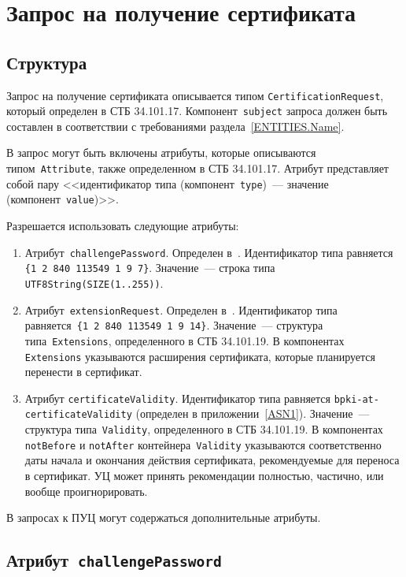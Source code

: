 \section{Запрос на получение сертификата}\label{FMT.CSR}

\subsection{Структура}\label{FMT.CSR.Structure}

Запрос на получение сертификата описывается типом 
\texttt{CertificationRequest}, который определен в СТБ 34.101.17. 
%
Компонент~\texttt{subject} запроса должен быть составлен в соответствии
с требованиями раздела~\ref{ENTITIES.Name}.

В запрос могут быть включены атрибуты, которые описываются 
типом~\texttt{Attribute}, также определенном в СТБ 34.101.17. 
Атрибут представляет собой пару <<идентификатор типа 
(компонент~\texttt{type})~--- значение (компонент~\texttt{value})>>.

Разрешается использовать следующие атрибуты:
\begin{enumerate}
\item
Атрибут~\texttt{challengePassword}. Определен в~\cite{PKCS9}.
%
Идентификатор типа равняется \verb|{1 2 840 113549 1 9 7}|.
Значение~--- строка типа \verb|UTF8String(SIZE(1..255))|.

\item
Атрибут~\texttt{extensionRequest}. Определен в~\cite{PKCS9}.
%
Идентификатор типа равняется~\verb|{1 2 840 113549 1 9 14}|.
Значение~--- структура типа~\verb|Extensions|, определенного в СТБ 34.101.19.
В компонентах \verb|Extensions| указываются расширения сертификата,
которые планируется перенести в сертификат.

\item
Атрибут \texttt{certificateValidity}.
Идентификатор типа равняется \verb|bpki-at-certificateValidity|
(определен в приложении~\ref{ASN1}). Значение~--- структура 
типа~\verb|Validity|, определенного в СТБ 34.101.19. 
%
В компонентах \texttt{notBefore} и \texttt{notAfter} контейнера~\verb|Validity| 
указываются соответственно даты начала и окончания действия сертификата,
рекомендуемые для переноса в сертификат.
%
УЦ может принять рекомендации полностью, частично, или вообще проигнорировать. 
\end{enumerate}

В запросах к ПУЦ могут содержаться дополнительные атрибуты.

\subsection{Атрибут~\texttt{challengePassword}}\label{FMT.CSR.CP}

